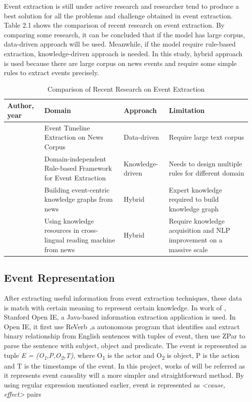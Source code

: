 \documentclass[twoside]{utmthesis}
\begin{document}
Event extraction is still under active research and researcher tend to produce a best solution for all the problems and challenge obtained in event extraction. Table 2.1 shows the comparison of recent research on event extraction. By comparing some research, it can be concluded that if the model has large corpus, data-driven approach will be used. Meanwhile, if the model require rule-based extraction, knowledge-driven approach is needed. In this study, hybrid approach is used because there are large corpus on news events and require some simple rules to extract events precisely.  

\begin{table}[H]
\fontsize{11}{12}\selectfont
\caption{Comparison of Recent Research on Event Extraction}
\renewcommand{\arraystretch}{1.2}
\begin{tabular}{|p{2cm} |p{4cm} |p{2cm}|p{5cm}|}
	\hline 
	Author, year & Domain & Approach & Limitation \\ 
	\hline 
	\citep{wu2017event}&Event Timeline Extraction on News Corpus &Data-driven  & Require large text corpus \\ 
	\hline 
	\citep{valenzuela2015domain}&Domain-independent Rule-based Framework for Event Extraction  & Knowledge-driven & Needs to design multiple rules for different domain  \\ 
	\hline 
	\citep{rospocher2016building}& Building event-centric knowledge graphs from news & Hybrid & Expert knowledge required to build knowledge graph \\ 
	\hline 
	\citep{vossen2016newsreader}&Using knowledge resources in cross-lingual reading machine from news  & Hybrid & Require knowledge acquisition and NLP improvement on a massive scale \\ 
	\hline 
\end{tabular} 
\end{table}
\vspace{-1cm}

\subsection{Event Representation}
After extracting useful information from event extraction techniques, these data is match with certain meaning to represent certain knowledge.  In work of \cite{ding2015deep}, Stanford Open IE, a Java-based information extraction application is used. In Open IE, it first use ReVerb \citep{ReVerb2011} ,a autonomous program that identifies and extract binary relationship from English sentences with tuples of event, then use ZPar \citep{zhang2011syntactic} to parse the sentence with subject, object and predicate. The event is represented as tuple \textit{E = (O\textsubscript{1},P,O\textsubscript{2},T)}, where O\textsubscript{1} is the actor and O\textsubscript{2} is object, P is the action and T is the timestamps of the event. In this project, works of \cite{zhao2017constructing} will be referred as it represents event causality will a more simpler and straightforward method. By using regular expression mentioned earlier, event is represented as \textit{<cause, effect>} pairs 
\end{document}
